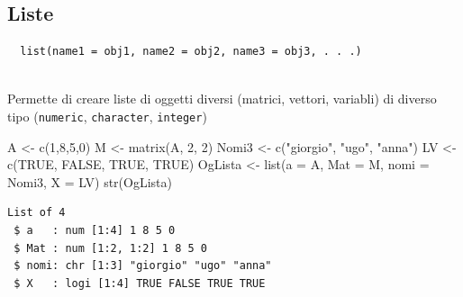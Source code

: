 \documentclass[
  ignorenonframetext,
  compress, aspectratio=149]{beamer}
\newenvironment{Shaded}{}{}
\newcommand{\AttributeTok}[1]{\textcolor[rgb]{0.00,0.34,0.68}{#1}}
\newcommand{\ConstantTok}[1]{\textcolor[rgb]{0.67,0.33,0.00}{#1}}
\newcommand{\DecValTok}[1]{\textcolor[rgb]{0.69,0.50,0.00}{#1}}
\newcommand{\FunctionTok}[1]{\textcolor[rgb]{0.39,0.29,0.61}{#1}}
\newcommand{\NormalTok}[1]{\textcolor[rgb]{0.12,0.11,0.11}{#1}}
\newcommand{\OtherTok}[1]{\textcolor[rgb]{0.00,0.43,0.16}{#1}}
\newcommand{\StringTok}[1]{\textcolor[rgb]{0.75,0.01,0.01}{#1}}
\begin{document}
\subsection{Liste}\label{liste}

\begin{frame}[fragile]{}
\label{section-13}
\begin{verbatim}
  list(name1 = obj1, name2 = obj2, name3 = obj3, . . .)
  
\end{verbatim}

\small

Permette di creare liste di oggetti diversi (matrici, vettori, variabli)
di diverso tipo (\texttt{numeric}, \texttt{character}, \texttt{integer})

\pause

\footnotesize

\begin{Shaded}
\begin{Highlighting}[]
\NormalTok{A }\OtherTok{\textless{}{-}} \FunctionTok{c}\NormalTok{(}\DecValTok{1}\NormalTok{,}\DecValTok{8}\NormalTok{,}\DecValTok{5}\NormalTok{,}\DecValTok{0}\NormalTok{)}
\NormalTok{M }\OtherTok{\textless{}{-}} \FunctionTok{matrix}\NormalTok{(A, }\DecValTok{2}\NormalTok{, }\DecValTok{2}\NormalTok{)}
\NormalTok{Nomi3 }\OtherTok{\textless{}{-}} \FunctionTok{c}\NormalTok{(}\StringTok{"giorgio"}\NormalTok{, }\StringTok{"ugo"}\NormalTok{, }\StringTok{"anna"}\NormalTok{)}
\NormalTok{LV }\OtherTok{\textless{}{-}} \FunctionTok{c}\NormalTok{(}\ConstantTok{TRUE}\NormalTok{, }\ConstantTok{FALSE}\NormalTok{, }\ConstantTok{TRUE}\NormalTok{, }\ConstantTok{TRUE}\NormalTok{)}
\NormalTok{OgLista }\OtherTok{\textless{}{-}} \FunctionTok{list}\NormalTok{(}\AttributeTok{a =}\NormalTok{ A, }\AttributeTok{Mat =}\NormalTok{ M, }\AttributeTok{nomi =}\NormalTok{ Nomi3, }\AttributeTok{X =}\NormalTok{ LV)}
\FunctionTok{str}\NormalTok{(OgLista)}
\end{Highlighting}
\end{Shaded}

\begin{verbatim}
List of 4
 $ a   : num [1:4] 1 8 5 0
 $ Mat : num [1:2, 1:2] 1 8 5 0
 $ nomi: chr [1:3] "giorgio" "ugo" "anna"
 $ X   : logi [1:4] TRUE FALSE TRUE TRUE
\end{verbatim}
\end{frame}
\end{document}
